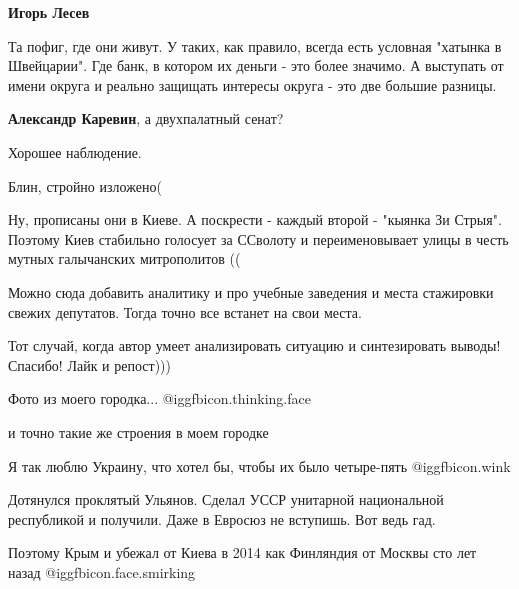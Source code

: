 \begin{itemize}
\begin{itemize}
\textbf{Игорь Лесев} 

Та пофиг, где они живут. У таких, как правило, всегда есть условная "хатынка в
Швейцарии". Где банк, в котором их деньги - это более значимо. А выступать от
имени округа и реально защищать интересы округа - это две большие разницы.

\textbf{Александр Каревин}, а двухпалатный сенат?
\end{itemize} %

Хорошее наблюдение.

Блин, стройно изложено(


Ну, прописаны они в Киеве. А поскрести - каждый второй - "кыянка Зи Стрыя".
Поэтому Киев стабильно голосует за ССволоту и переименовывает улицы в честь
мутных галычанских митрополитов ((

\begin{itemize} %
Можно сюда добавить аналитику и про учебные заведения и места стажировки свежих депутатов. Тогда точно все встанет на свои места.
\end{itemize} %

Тот случай, когда автор умеет анализировать ситуацию и синтезировать выводы! Спасибо! Лайк и репост)))

Фото из моего городка...  @igg{fbicon.thinking.face} 

и точно такие же строения в моем городке

Я так люблю Украину, что хотел бы, чтобы их было четыре-пять  @igg{fbicon.wink} 

Дотянулся проклятый Ульянов. Сделал УССР унитарной национальной республикой и получили. Даже в Евросюз не вступишь. Вот ведь гад.

Поэтому Крым и убежал от Киева в 2014 как Финляндия от Москвы сто лет назад  @igg{fbicon.face.smirking} 



\end{itemize}
